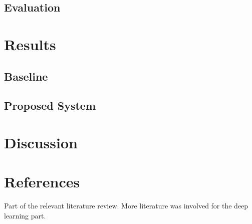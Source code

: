 \documentclass[12pt]{article}
\begin{document}


\subsection{Evaluation}


\section{Results}\label{results}
\subsection{Baseline}
\subsection{Proposed System}


\section{Discussion}\label{discussion}

\section{References}\label{References}

Part of the relevant literature review. More literature was involved for
the deep learning part.
\end{document}
